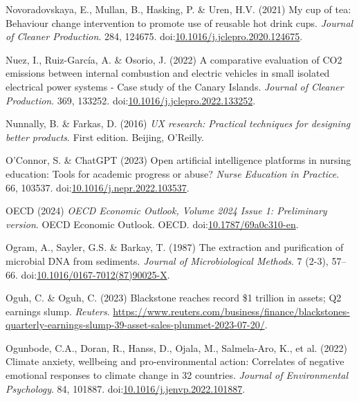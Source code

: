 \documentclass[
  letterpaper,
  DIV=11,
  numbers=noendperiod]{scrartcl}
\newlength{\cslhangindent}
\newenvironment{CSLReferences}[2] %
 {\begin{list}{}{%
  \setlength{\itemindent}{0pt}
  \setlength{\leftmargin}{0pt}
  \setlength{\parsep}{0pt}
  \ifodd #1
   \setlength{\leftmargin}{\cslhangindent}
   \setlength{\itemindent}{-1\cslhangindent}
  \fi
  \setlength{\itemsep}{#2\baselineskip}}}
 {\end{list}}
\begin{document}
\begin{CSLReferences}{0}{1}
Novoradovskaya, E., Mullan, B., Hasking, P. \& Uren, H.V. (2021) My cup
of tea: {Behaviour} change intervention to promote use of reusable hot
drink cups. \emph{Journal of Cleaner Production}. 284, 124675.
doi:\href{https://doi.org/10.1016/j.jclepro.2020.124675}{10.1016/j.jclepro.2020.124675}.

Nuez, I., Ruiz-García, A. \& Osorio, J. (2022) A comparative evaluation
of {CO2} emissions between internal combustion and electric vehicles in
small isolated electrical power systems - {Case} study of the {Canary
Islands}. \emph{Journal of Cleaner Production}. 369, 133252.
doi:\href{https://doi.org/10.1016/j.jclepro.2022.133252}{10.1016/j.jclepro.2022.133252}.

Nunnally, B. \& Farkas, D. (2016) \emph{{UX} research: Practical
techniques for designing better products}. First edition. Beijing,
O'Reilly.

O'Connor, S. \& ChatGPT (2023) Open artificial intelligence platforms in
nursing education: {Tools} for academic progress or abuse? \emph{Nurse
Education in Practice}. 66, 103537.
doi:\href{https://doi.org/10.1016/j.nepr.2022.103537}{10.1016/j.nepr.2022.103537}.

OECD (2024) \emph{{OECD Economic Outlook}, {Volume} 2024 {Issue} 1:
{Preliminary} version}. {OECD Economic Outlook}. OECD.
doi:\href{https://doi.org/10.1787/69a0c310-en}{10.1787/69a0c310-en}.

Ogram, A., Sayler, G.S. \& Barkay, T. (1987) The extraction and
purification of microbial {DNA} from sediments. \emph{Journal of
Microbiological Methods}. 7 (2-3), 57--66.
doi:\href{https://doi.org/10.1016/0167-7012(87)90025-X}{10.1016/0167-7012(87)90025-X}.

Oguh, C. \& Oguh, C. (2023) Blackstone reaches record \$1 trillion in
assets; {Q2} earnings slump. \emph{Reuters}.
\url{https://www.reuters.com/business/finance/blackstones-quarterly-earnings-slump-39-asset-sales-plummet-2023-07-20/}.

Ogunbode, C.A., Doran, R., Hanss, D., Ojala, M., Salmela-Aro, K., et al.
(2022) Climate anxiety, wellbeing and pro-environmental action:
Correlates of negative emotional responses to climate change in 32
countries. \emph{Journal of Environmental Psychology}. 84, 101887.
doi:\href{https://doi.org/10.1016/j.jenvp.2022.101887}{10.1016/j.jenvp.2022.101887}.


\end{CSLReferences}
\end{document}
